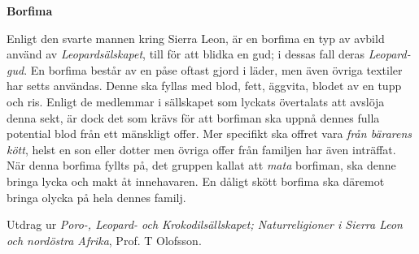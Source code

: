 \begin{displayquote}
	\textbf{Borfima}

	Enligt den svarte mannen kring Sierra Leon, är en borfima en typ av avbild använd av \textit{Leopardsälskapet}, till för att blidka en gud; i dessas fall deras \textit{Leopard-gud}. En borfima består av en påse oftast gjord i läder, men även övriga textiler har setts användas. Denne ska fyllas med blod, fett, äggvita, blodet av en tupp och ris. Enligt de medlemmar i sällskapet som lyckats övertalats att avslöja denna sekt, är dock det som krävs för att borfiman ska uppnå dennes fulla potential blod från ett mänskligt offer. Mer specifikt ska offret vara \textit{från bärarens kött}, helst en son eller dotter men övriga offer från familjen har även inträffat. När denna borfima fyllts på, det gruppen kallat att \textit{mata} borfiman, ska denne bringa lycka och makt åt innehavaren. En dåligt skött borfima ska däremot bringa olycka på hela dennes familj.

	Utdrag ur \textit{Poro-, Leopard- och Krokodilsällskapet; Naturreligioner i Sierra Leon och nordöstra Afrika}, Prof. T Olofsson.
\end{displayquote}
